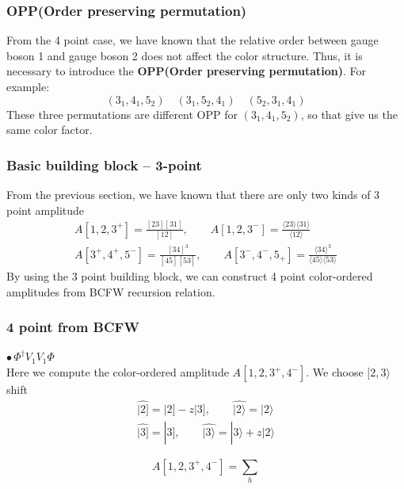 \documentclass{beamer}
\newcommand{\aket}[1]{|#1\rangle}
\newcommand{\sket}[1]{|#1]}
\newcommand{\avg}[1]{\langle #1 \rangle}
\begin{document}
\begin{frame}
    \frametitle{OPP(Order preserving permutation)}
    From the 4 point case, we have known that the relative order between gauge boson 1 and gauge boson 2 does not affect the color structure. 
    Thus, it is necessary to introduce the \textbf{OPP(Order preserving permutation)}. For example:
    \begin{equation*}
        (3_1,4_1,5_2) \quad (3_1,5_2,4_1) \quad (5_2,3_1,4_1)
    \end{equation*}
    These three permutations are different OPP for $(3_1,4_1,5_2)$, so that give us the same color factor.
\end{frame}
\begin{frame}
    \frametitle{Basic building block -- 3-point}
    From the previous section, we have known that there are only two kinds of 3 point amplitude
    \begin{gather*}
        A[1,2,3^+]=\frac{[23][31]}{[12]},\qquad A[1,2,3^-]=\frac{\avg{23}\!\avg{31}}{\avg{12}}\\
        A[3^+,4^+,5^-]=\frac{[34]^3}{[45][53]},\qquad A[3^-,4^-,5_+]=\frac{\avg{34}^3}{\avg{45}\!\avg{53}}
    \end{gather*}
    By using the 3 point building block, we can construct 4 point color-ordered amplitudes from BCFW recursion relation.
\end{frame}

\begin{frame}
    \frametitle{4 point from BCFW}
    $\bullet \, \Phi^\dagger V_1V_1\Phi$\\
    Here we compute the color-ordered amplitude $A[1,2,3^+,4^-]$. We choose $[2,3\rangle$ shift
    \begin{gather*}
        \hat{\sket{2}}=\sket{2}-z\sket{3},\qquad \hat{\aket{2}}=\aket{2} \\
        \hat{\sket{3}}=\sket{3},\qquad \hat{\aket{3}}=\aket{3}+z\aket{2}
    \end{gather*}
    \begin{minipage}{0.5\textwidth}
        \begin{equation*}
        A[1,2,3^+,4^-] = \sum_{h}
        \end{equation*}
        \end{minipage}
        \hspace{-3em}
        \begin{minipage}{0.45\textwidth}
        \end{minipage}
\end{frame}
\end{document}
